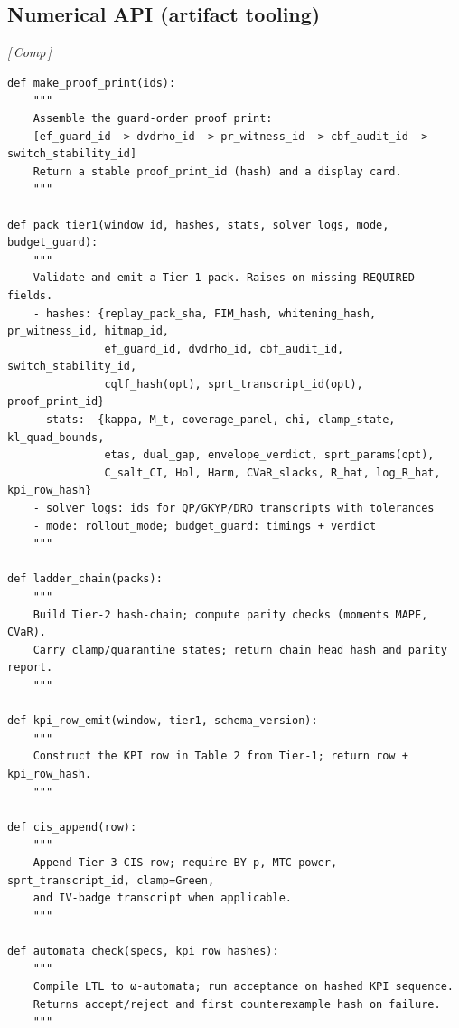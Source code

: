 \documentclass[10pt]{article}
\newcommand{\layertag}[1]{\textsf{\footnotesize[\,#1\,]}}
\begin{document}
\subsection{Numerical API (artifact tooling)}\label{subsec:api-artifacts}
\emph{\layertag{Comp}}
\begin{lstlisting}
def make_proof_print(ids):
    """
    Assemble the guard-order proof print:
    [ef_guard_id -> dvdrho_id -> pr_witness_id -> cbf_audit_id -> switch_stability_id]
    Return a stable proof_print_id (hash) and a display card.
    """

def pack_tier1(window_id, hashes, stats, solver_logs, mode, budget_guard):
    """
    Validate and emit a Tier-1 pack. Raises on missing REQUIRED fields.
    - hashes: {replay_pack_sha, FIM_hash, whitening_hash, pr_witness_id, hitmap_id,
               ef_guard_id, dvdrho_id, cbf_audit_id, switch_stability_id,
               cqlf_hash(opt), sprt_transcript_id(opt), proof_print_id}
    - stats:  {kappa, M_t, coverage_panel, chi, clamp_state, kl_quad_bounds,
               etas, dual_gap, envelope_verdict, sprt_params(opt),
               C_salt_CI, Hol, Harm, CVaR_slacks, R_hat, log_R_hat, kpi_row_hash}
    - solver_logs: ids for QP/GKYP/DRO transcripts with tolerances
    - mode: rollout_mode; budget_guard: timings + verdict
    """

def ladder_chain(packs):
    """
    Build Tier-2 hash-chain; compute parity checks (moments MAPE, CVaR).
    Carry clamp/quarantine states; return chain head hash and parity report.
    """

def kpi_row_emit(window, tier1, schema_version):
    """
    Construct the KPI row in Table 2 from Tier-1; return row + kpi_row_hash.
    """

def cis_append(row):
    """
    Append Tier-3 CIS row; require BY p, MTC power, sprt_transcript_id, clamp=Green,
    and IV-badge transcript when applicable.
    """

def automata_check(specs, kpi_row_hashes):
    """
    Compile LTL to ω-automata; run acceptance on hashed KPI sequence.
    Returns accept/reject and first counterexample hash on failure.
    """
\end{lstlisting}
\end{document}

